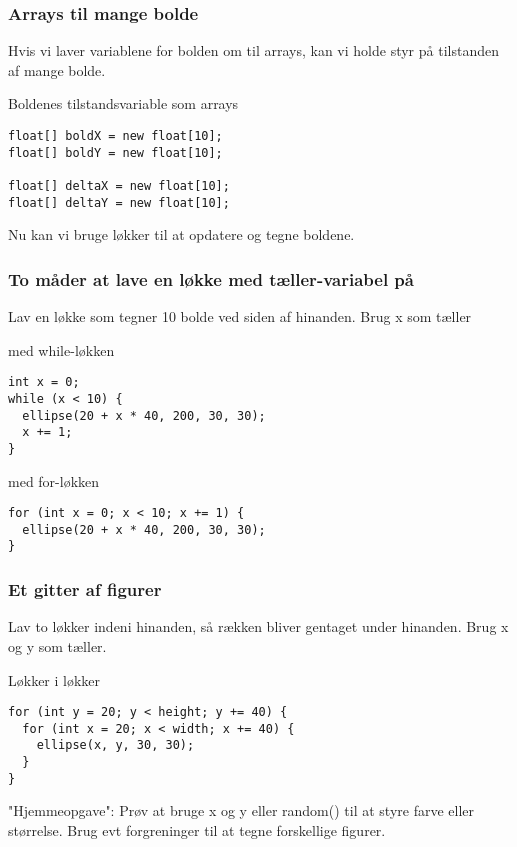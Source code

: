 \documentclass{beamer}
\begin{document}
\begin{frame}[fragile]
  \frametitle{Arrays til mange bolde}
  
  Hvis vi laver variablene for bolden om til arrays, kan vi holde styr
  på tilstanden af mange bolde.
 
  \begin{block}{Boldenes tilstandsvariable som arrays}
\begin{verbatim}
float[] boldX = new float[10];
float[] boldY = new float[10];

float[] deltaX = new float[10];
float[] deltaY = new float[10];
\end{verbatim}
  \end{block}
  
  Nu kan vi bruge løkker til at opdatere og tegne boldene.
  
\end{frame}


\begin{frame}[fragile]
  \frametitle{To måder at lave en løkke med tæller-variabel på}

  Lav en løkke som tegner 10 bolde ved siden af hinanden. Brug x som tæller
  \begin{block}{med while-løkken}  
\begin{verbatim}
int x = 0;
while (x < 10) {
  ellipse(20 + x * 40, 200, 30, 30);
  x += 1;
}
\end{verbatim}  
  \end{block}
  
  \begin{block}{med for-løkken}
\begin{verbatim}
for (int x = 0; x < 10; x += 1) {
  ellipse(20 + x * 40, 200, 30, 30);
}
\end{verbatim}  
  \end{block}
    
\end{frame}

\begin{frame}[fragile]
  \frametitle{Et gitter af figurer}

  Lav to løkker indeni hinanden, så rækken bliver gentaget under hinanden. Brug x og y som tæller. 
  
  \begin{block}{Løkker i løkker}    
\begin{verbatim}
for (int y = 20; y < height; y += 40) {
  for (int x = 20; x < width; x += 40) {
    ellipse(x, y, 30, 30);
  }
}
\end{verbatim}  
  \end{block}
  
"Hjemmeopgave": Prøv at bruge x og y eller random() til at styre farve eller størrelse. Brug evt forgreninger til at tegne forskellige figurer.
  
\end{frame}
\end{document}
